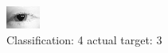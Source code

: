 \begin{figure}[h!]
\begin{center}
\includegraphics[width=0.60\columnwidth]{figures/ID117_class_4_target_3.png}
\end{center}
\caption{ Classification: 4 actual target: 3}
\label{fig:ID117_class_4_target_3}
\end{figure}
